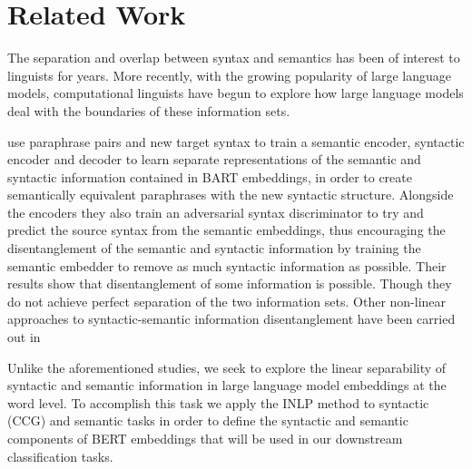 \documentclass[11pt,a4paper]{article}
\begin{document}
\section{Related Work}
\label{sec:related}



The separation and overlap between syntax and semantics has been of interest to linguists for years. More recently, with the growing popularity of large language models, computational linguists have begun to explore how large language models deal with the boundaries of these information sets.

\citealp{disentangle} use paraphrase pairs and new target syntax to train a semantic encoder, syntactic encoder and decoder to learn separate representations of the semantic and syntactic information contained in BART embeddings, in order to create semantically equivalent paraphrases with the new syntactic structure. Alongside the encoders they also train an adversarial syntax discriminator to try and predict the source syntax from the semantic embeddings, thus encouraging the disentanglement of the semantic and syntactic information by training the semantic embedder to remove as much syntactic information as possible. Their results show that disentanglement of some information is possible. Though they do not achieve perfect separation of the two information sets. Other non-linear approaches to syntactic-semantic information disentanglement have been carried out in \citealp{multiDis}


Unlike the aforementioned studies, we seek to explore the linear separability of syntactic and semantic information in large language model embeddings at the word level. To accomplish this task we apply the INLP method to syntactic (CCG) and semantic tasks in order to define the syntactic and semantic components of BERT embeddings that will be used in our downstream classification tasks. 
\end{document}
